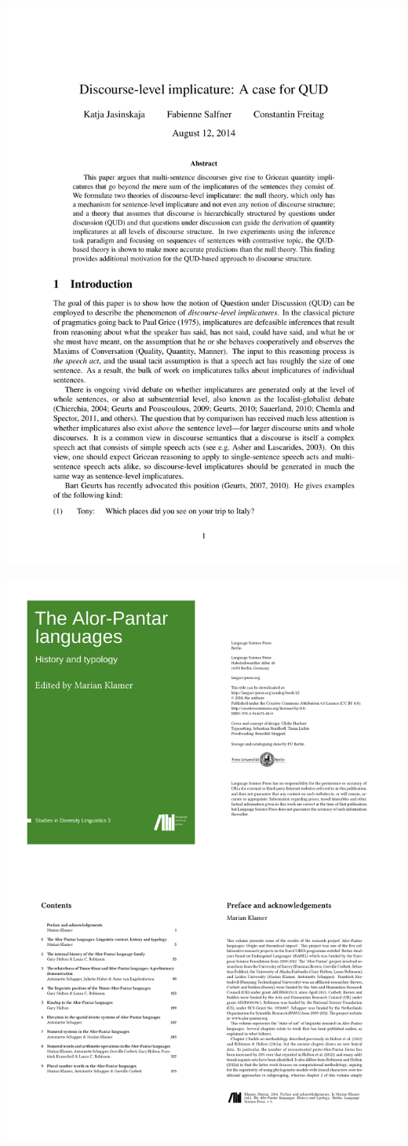 {\begin{frame}
\begin{minipage}[c]{0.49\textwidth}
\centering
\includegraphics[width=0.80\linewidth]{../../texfiles-beamer/tex-material/WissArb-latex/LaTeX_article.pdf}
\end{minipage}  
%  
\begin{minipage}[c]{0.49\textwidth}
\centering
\includegraphics[width=0.80\linewidth]{../../texfiles-beamer/tex-material/WissArb-latex/LaTeX_book_2.pdf}

\end{minipage}
\end{frame}}
